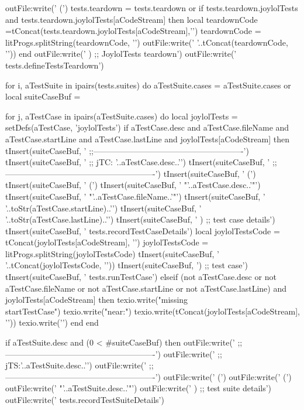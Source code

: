   outFile:write('  (\n')
  tests.teardown = tests.teardown or { }
  if tests.teardown.joylolTests and
    tests.teardown.joylolTests[aCodeStream] then
    local teardownCode =tConcat(tests.teardown.joylolTests[aCodeStream],'\n  ')
    teardownCode = litProgs.splitString(teardownCode, '\n')
    outFile:write('  '..tConcat(teardownCode, '\n  '))
  end
  outFile:write('  ) ;; JoylolTests teardown\n')
  outFile:write('  tests.defineTestsTeardown\n\n')

  for i, aTestSuite in ipairs(tests.suites) do
    aTestSuite.cases = aTestSuite.cases or { }
    local suiteCaseBuf = { }

    for j, aTestCase in ipairs(aTestSuite.cases) do
      local joylolTests     = setDefs(aTestCase, 'joylolTests')
      if aTestCase.desc and
        aTestCase.fileName and
        aTestCase.startLine and
        aTestCase.lastLine and
        joylolTests[aCodeStream] then
        tInsert(suiteCaseBuf, '    ;;-------------------------------------------------------\n')
        tInsert(suiteCaseBuf, '    ;; jTC: '..aTestCase.desc..'\n')
        tInsert(suiteCaseBuf, '    ;;-------------------------------------------------------\n')
        tInsert(suiteCaseBuf, '    (\n')
        tInsert(suiteCaseBuf, '      (\n')
        tInsert(suiteCaseBuf, '        "'..aTestCase.desc..'"\n')
        tInsert(suiteCaseBuf, '        "'..aTestCase.fileName..'"\n')
        tInsert(suiteCaseBuf, '        '..toStr(aTestCase.startLine)..'\n')
        tInsert(suiteCaseBuf, '        '..toStr(aTestCase.lastLine)..'\n')
        tInsert(suiteCaseBuf, '      ) ;; test case details\n')
        tInsert(suiteCaseBuf, '      tests.recordTestCaseDetails\n\n')
        local joylolTestsCode = tConcat(joylolTests[aCodeStream], '\n')
        joylolTestsCode       = litProgs.splitString(joylolTestsCode)
        tInsert(suiteCaseBuf, '    '..tConcat(joylolTestsCode, '\n    '))
        tInsert(suiteCaseBuf, '\n    ) ;; test case\n')
        tInsert(suiteCaseBuf, '    tests.runTestCase\n\n')
      elseif (not aTestCase.desc or
        not aTestCase.fileName or
        not aTestCase.startLine or
        not aTestCase.lastLine) and
        joylolTests[aCodeStream] then
        texio.write("\nERROR missing \\startTestCase\n")
        texio.write("near:\n")
        texio.write(tConcat(joylolTests[aCodeStream], '\n'))
        texio.write('\n')
      end
    end

    if aTestSuite.desc and (0 < #suiteCaseBuf) then
      outFile:write('  ;;-------------------------------------------------------\n')
      outFile:write('  ;; jTS:'..aTestSuite.desc..'\n')
      outFile:write('  ;;-------------------------------------------------------\n')
      outFile:write('  (\n')
      outFile:write('    (\n')
      outFile:write('      "'..aTestSuite.desc..'"\n')
      outFile:write('    ) ;; test suite details\n')
      outFile:write('    tests.recordTestSuiteDetails\n\n')

